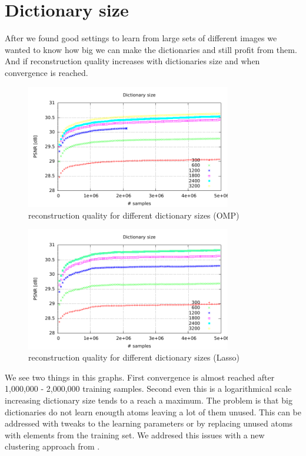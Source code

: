 \newpage
\section{Dictionary size}
After we found good settings to learn from large sets of different images we
wanted to know how big we can make the dictionaries and still profit from them.
And if reconstruction quality increases with dictionaries size and when
convergence is reached.

\begin{figure}[h]
\centering
\includegraphics[width = 0.8\textwidth]{../tests/results/dictSizeOMP.pdf}
\caption{reconstruction quality for different dictionary sizes (OMP)}
\label{fig:dictSizeOMP}
\end{figure}

\begin{figure}[h]
\centering
\includegraphics[width = 0.8\textwidth]{../tests/results/dictSizeLasso.pdf}
\caption{reconstruction quality for different dictionary sizes (Lasso)}
\label{fig:dict size}
\end{figure}

We see two things in this graphs. First convergence is almost reached
after 1,000,000 - 2,000,000 training samples. Second even this is a
logarithmical scale increasing dictionary size tends to a reach a maximum. The
problem is that big dictionaries do not learn enougth atoms leaving a lot of
them unused. This can be addressed with tweaks to the learning parameters or by
replacing unused atoms with elements from the training set. We addresed this
issues with a new clustering approach from .

